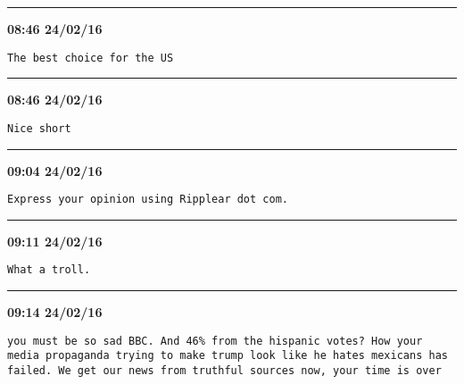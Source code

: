 \hrule%

\begin{adjustwidth}{0cm}{0cm}
\footnotesize \textbf{08:46 24/02/16}

\begin{lstlisting}[breaklines, breakatwhitespace, basicstyle=\small, frame=leftline]
The best choice for the US
\end{lstlisting}
\end{adjustwidth}

\hrule%

\begin{adjustwidth}{0cm}{0cm}
\footnotesize \textbf{08:46 24/02/16}

\begin{lstlisting}[breaklines, breakatwhitespace, basicstyle=\small, frame=leftline]
Nice short
\end{lstlisting}
\end{adjustwidth}

\hrule%

\begin{adjustwidth}{0cm}{0cm}
\footnotesize \textbf{09:04 24/02/16}

\begin{lstlisting}[breaklines, breakatwhitespace, basicstyle=\small, frame=leftline]
Express your opinion using Ripplear dot com.
\end{lstlisting}
\end{adjustwidth}

\hrule%

\begin{adjustwidth}{0cm}{0cm}
\footnotesize \textbf{09:11 24/02/16}

\begin{lstlisting}[breaklines, breakatwhitespace, basicstyle=\small, frame=leftline]
What a troll.
\end{lstlisting}
\end{adjustwidth}

\hrule%

\begin{adjustwidth}{0cm}{0cm}
\footnotesize \textbf{09:14 24/02/16}

\begin{lstlisting}[breaklines, breakatwhitespace, basicstyle=\small, frame=leftline]
you must be so sad BBC. And 46% from the hispanic votes? How your media propaganda trying to make trump look like he hates mexicans has failed. We get our news from truthful sources now, your time is over
\end{lstlisting}
\end{adjustwidth}

